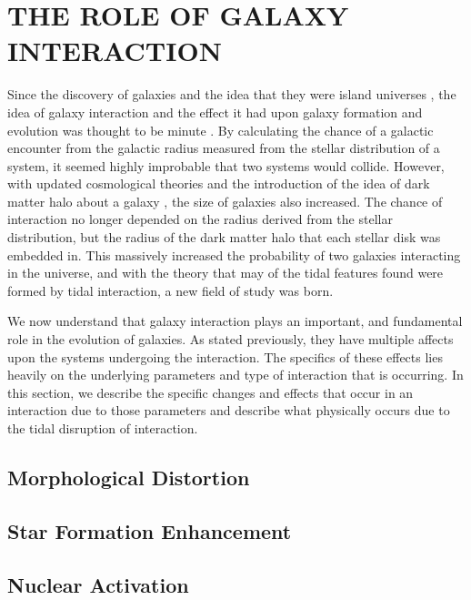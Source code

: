 \section{THE ROLE OF GALAXY INTERACTION}
Since the discovery of galaxies and the idea that they were island universes \citep{Hubble paper}, the idea of galaxy interaction and the effect it had upon galaxy formation and evolution was thought to be minute \citep{Found this info in Chapter 8 of Binne and Tremaine. Need to find a better source!}. By calculating the chance of a galactic encounter from the galactic radius measured from the stellar distribution of a system, it seemed highly improbable that two systems would collide. However, with updated cosmological theories and the introduction of the idea of dark matter halo about a galaxy \citep{Which paper introduced the idea of a galactic halo?}, the size of galaxies also increased. The chance of interaction no longer depended on the radius derived from the stellar distribution, but the radius of the dark matter halo that each stellar disk was embedded in. This massively increased the probability of two galaxies interacting in the universe, and with the theory that may of the tidal features found were formed by tidal interaction, a new field of study was born. 

We now understand that galaxy interaction plays an important, and fundamental role in the evolution of galaxies. As stated previously, they have multiple affects upon the systems undergoing the interaction. The specifics of these effects lies heavily on the underlying parameters and type of interaction that is occurring. In this section, we describe the specific changes and effects that occur in an interaction due to those parameters and describe what physically occurs due to the tidal disruption of interaction. 

\subsection{Morphological Distortion}
\subsection{Star Formation Enhancement}
\subsection{Nuclear Activation}
